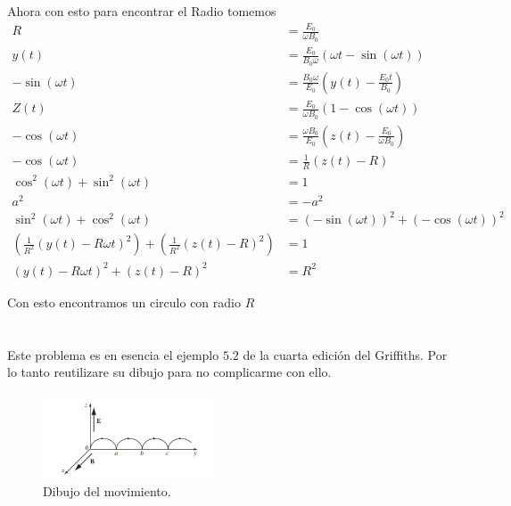 \documentclass{report}
\begin{document}
Ahora con esto para encontrar el Radio tomemos
\begin{align*}
	R &= \frac{E_0}{\omega B_0}\\
	y(t) &= \frac{E_0}{B_0 \omega} \left(\omega t - \sin\left(\omega t\right)\right)\\
	- \sin \left(\omega t\right) &= \frac{B_0 \omega}{E_0} \left(y(t) - \frac{E_0 t}{B_0}\right)\\
	Z(t) &= \frac{E_0}{\omega B_0} \left(1 - \cos\left(\omega t \right)\right)\\
	- \cos\left(\omega t\right) &= \frac{\omega B_0}{E_0}\left(z(t) - \frac{E_0}{\omega B_0}\right)\\
	- \cos\left(\omega t\right) &= \frac{1}{R} \left( z(t) - R\right)\\
	\cos^2\left(\omega t\right) + \sin^2\left(\omega t\right) &= 1\\
	a^2 &= -a^2\\
	\sin^2\left(\omega t\right) + \cos^2\left(\omega t\right) &= \left(- \sin\left(\omega t\right)\right)^2 + \left(- \cos\left(\omega t\right)\right)^2\\
	\left(\frac{1}{R^2} \left(y(t) - R \omega t\right)^2\right) + \left(\frac{1}{R^2} \left(z(t) - R \right)^2\right) &= 1\\
	\left(y(t) - R\omega t\right)^2 + \left(z(t) - R\right)^2 &= R^2
\end{align*}

Con esto encontramos un circulo con radio $R$

\section{}

Este problema es en esencia el ejemplo $5.2$ de la cuarta edición del Griffiths. Por lo tanto reutilizare su dibujo para no complicarme con ello.

\begin{figure}[H]
	\begin{center}
		\includegraphics[width=0.45\textwidth]{img/book_5_7.png}
	\end{center}
	\caption{Dibujo del movimiento.}\label{fig:book_5_7}
\end{figure}
\end{document}
